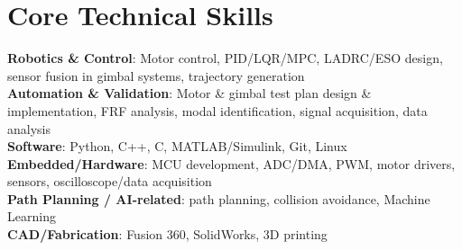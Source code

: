 \documentclass[letterpaper,11pt]{article}
\begin{document}
\section{Core Technical Skills}
 \begin{itemize}[leftmargin=0.15in, label={}]
    \small{\item{
     \textbf{Robotics \& Control}{: Motor control, PID/LQR/MPC, LADRC/ESO design, sensor fusion in gimbal systems, trajectory generation} \\
     \textbf{Automation \& Validation}{: Motor \& gimbal test plan design \& implementation, FRF analysis, modal identification, signal acquisition, data analysis} \\
     \textbf{Software}{: Python, C++, C, MATLAB/Simulink, Git, Linux} \\
     \textbf{Embedded/Hardware}{: MCU development, ADC/DMA, PWM, motor drivers, sensors, oscilloscope/data acquisition} \\
     \textbf{Path Planning / AI-related}{: path planning, collision avoidance, Machine Learning} \\
     \textbf{CAD/Fabrication}{: Fusion 360, SolidWorks, 3D printing}
    }}
 \end{itemize}

\end{document}
